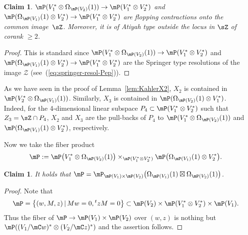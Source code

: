 \documentclass[10pt,a4paper]{amsart}
\numberwithin{equation}{section}
\newtheorem{cla}[Theorem]{Claim}
 { \theoremstyle{definition}
\newtheorem{Definition}[Theorem]{Definition}
\newtheorem{Observation}[Theorem]{Observation}
\newtheorem*{Main}{Main result}
\newtheorem{Remark}[Theorem]{Remark} }
\begin{document}
\begin{cla}$\mP(V_{1}^{*}\otimes\Omega_{\mP(V_{2})}(1))\to\mP(V_{1}^{*}\otimes V_{2}^{*})$ and $\mP(\Omega_{\mP(V_{1})}(1)\otimes V_{2}^{*})\to\mP(V_{1}^{*}\otimes V_{2}^{*})$ are flopping contractions onto the common image~$\sZ$. Moreover, it is of Atiyah type outside the locus in $\sZ$ of corank $\geq2$.
\end{cla}
\begin{proof} This is standard since $\mP(V_{1}^{*}\otimes\Omega_{\mP(V_{2})}(1))\to\mP(V_{1}^{*}\otimes V_{2}^{*})$ and $\mP(\Omega_{\mP(V_{1})}(1)\otimes V_{2}^{*})\to\mP(V_{1}^{*}\otimes V_{2}^{*})$ are the Springer type resolutions of the image $\mathcal{Z}$ (see~(\ref{eq:springer-resol-Pep})).
\end{proof}

As we have seen in the proof of Lemma~\ref{lem:KahlerX2}, $X_{2}$ is contained in
$\mP(V_{2}^{*}\otimes\Omega_{\mP(V_{1})}(1))$. Similarly, $X_{3}$
is contained in $\mP(\Omega_{\mP(V_{2})}(1)\otimes V_{1}^{*})$. Indeed,
for the 4-dimensional linear subspace $P_{4}\subset\mP(V_{1}^{*}\otimes V_{2}^{*})$
such that $Z_{3}=\sZ\cap P_{4}$, $X_{2}$ and $X_{3}$ are the pull-backs
of $P_{4}$ to $\mP(V_{1}^{*}\otimes\Omega_{\mP(V_{2})}(1))$ and
$\mP(\Omega_{\mP(V_{1})}(1)\otimes V_{2}^{*})$, respectively.

Now we take the fiber product
\begin{gather*}
\mP:=\mP\big(V_{1}^{*}\otimes\Omega_{\mP(V_{2})}(1)\big)\times_{\mP(V_{1}^{*}\otimes V_{2}^{*})}\mP\big(\Omega_{\mP(V_{1})}(1)\otimes V_{2}^{*}\big).
\end{gather*}
\begin{cla}
It holds that $\mP=\mP_{\mP(V_{1})\times\mP(V_{2})}\big(\Omega_{\mP(V_{1})}(1)\boxtimes\Omega_{\mP(V_{2})}(1)\big)$.
\end{cla}
\begin{proof}Note that
\begin{gather*}
\mP=\big\{(w,M,z)\,|\, Mw=0,{\empty^{t}z}M=0\big\}\subset\mP(V_{2})\times\mP(V_{1}^{*}\otimes V_{2}^{*})\times\mP(V_{1}).
\end{gather*}
Thus the fiber of $\mP\to\mP(V_{1})\times\mP(V_{2})$ over $(w,z)$ is nothing but $\mP((V_{1}/\mC w)^{*}\otimes(V_{2}/\mC z)^{*})$ and the assertion follows.
\end{proof}
\end{document}
